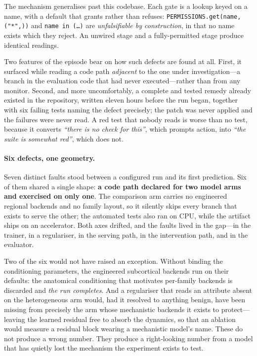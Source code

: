 The mechanism generalises past this codebase. Each gate is a lookup keyed on a
name, with a default that grants rather than refuses:
\texttt{PERMISSIONS.get(name, ("*",))} and \texttt{name in (\ldots)} are
\emph{unfalsifiable by construction}, in that no name exists which they reject.
An unwired stage and a fully-permitted stage produce identical readings.

Two features of the episode bear on how such defects are found at all. First, it
surfaced while reading a code path \emph{adjacent} to the one under
investigation---a branch in the evaluation code that had never executed---rather
than from any monitor. Second, and more uncomfortably, a complete and tested
remedy already existed in the repository, written eleven hours before the run
began, together with six failing tests naming the defect precisely; the patch
was never applied and the failures were never read. A red test that nobody reads
is worse than no test, because it converts \emph{``there is no check for this''},
which prompts action, into \emph{``the suite is somewhat red''}, which does not.

\paragraph{Six defects, one geometry.}
Seven distinct faults stood between a configured run and its first prediction.
Six of them shared a single shape: \textbf{a code path declared for two model
arms and exercised on only one}. The comparison arm carries no engineered
regional backends and no family layout, so it silently skips every branch that
exists to serve the other; the automated tests also ran on CPU, while the
artifact ships on an accelerator. Both axes drifted, and the faults lived in
the gap---in the trainer, in a regulariser, in the serving path, in the
intervention path, and in the evaluator.

Two of the six would not have raised an exception. Without binding the
conditioning parameters, the engineered subcortical backends run on their
defaults: the anatomical conditioning that motivates per-family backends is
discarded and \emph{the run completes}. And a regulariser that reads an
attribute absent on the heterogeneous arm would, had it resolved to anything
benign, have been missing from precisely the arm whose mechanistic backends it
exists to protect---leaving the learned residual free to absorb the dynamics,
so that an ablation would measure a residual block wearing a mechanistic
model's name. These do not produce a wrong number. They produce a
right-looking number from a model that has quietly lost the mechanism the
experiment exists to test.

